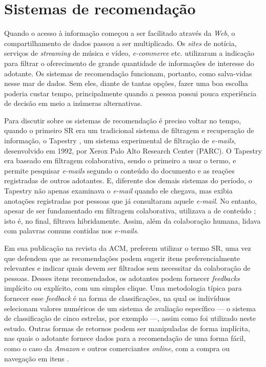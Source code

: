 \documentclass[portuguese]{textolivre}
\begin{document}
\section{Sistemas de recomendação}
\label{cap:recsys}

Quando o acesso à informação começou a ser facilitado através da \emph{Web}, o compartilhamento de dados passou a ser multiplicado. Os \textit{sites} de notícia, serviços de \emph{streaming} de música e vídeo, \emph{e-commerce} etc. utilizaram a indicação para filtrar o oferecimento de grande quantidade de informações de interesse do adotante. Os sistemas de recomendação funcionam, portanto, como salva-vidas nesse mar de dados. Sem eles, diante de tantas opções, fazer uma boa escolha poderia custar tempo, principalmente quando a pessoa possui pouca experiência de decisão em meio a inúmeras alternativas.

Para discutir sobre os sistemas de recomendação é preciso voltar no tempo, quando o primeiro SR era um tradicional sistema de filtragem e recuperação de informação, o Tapestry \cite{Goldberg:1992:UCF:138859.138867}, um sistema experimental de filtração de \emph{e-mails}, desenvolvido em 1992, por Xerox Palo Alto Research Center (PARC). O Tapestry era baseado em filtragem colaborativa, sendo o primeiro a usar o termo, e permite pesquisar \emph{e-mails} segundo o conteúdo do documento e as reações registradas de outros adotantes. E, diferente dos demais sistemas do período, o Tapestry não apenas examinava o \emph{e-mail} quando ele chegava, mas exibia anotações registradas por pessoas que já consultaram aquele \emph{e-mail}. No entanto, apesar de ser fundamentado em filtragem colaborativa, utilizava a de conteúdo \cite{Goldberg:1992:UCF:138859.138867}; isto é, no final, filtrava hibridamente. Assim, além da colaboração humana, lidava com palavras comuns contidas nos \emph{e-mails}.


Em sua publicação na revista da ACM, \textcite{Resnick:1997:RS:245108.245121} preferem utilizar o termo SR, uma vez que defendem que as recomendações podem sugerir itens preferencialmente relevantes e indicar quais devem ser filtrados sem necessitar da colaboração de pessoas. Desses itens recomendados, os adotantes podem fornecer \emph{feedbacks} implícito ou explícito, com um simples clique. Uma metodologia típica para fornecer esse \emph{feedback} é na forma de classificações, na qual os indivíduos selecionam valores numéricos de um sistema de avaliação específico — o sistema de classificação de cinco estrelas, por exemplo \textcite{Aggarwal2016} —, assim como foi utilizado neste estudo. Outras formas de retornos podem ser manipuladas de forma implícita, nas quais o adotante fornece dados para a recomendação de uma forma fácil, como o caso da \emph{Amazon} e outros comerciantes \emph{online}, com a compra ou navegação em itens \cite{Aggarwal2016}.
\end{document}
